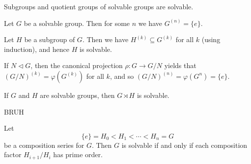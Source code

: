 \begin{corollary} \label{cor-solvable}
	Subgroups and quotient groups of solvable groups are solvable.
\end{corollary}
\begin{sketch}
	Let $G$ be a solvable group. Then for some $n$ we have $G^{(n)} = \{e\}$.
	
	Let $H$ be a subgroup of  $G$. Then we have $H^{(k)} \subseteq G^{(k)}$ for all $k$ (using induction), and hence $H$ is solvable.
	
	If $N \lhd G$, then the canonical projection $\rho : G \rightarrow G/N$ yields that $(G/N)^{(k)} = \varphi(G^{(k)})$ for all $k$, and so   $(G/N)^{(n)} = \varphi(G^{n}) =\{e\}$.
\end{sketch}

\begin{proposition}
	If $G$ and $H$ are solvable groups, then $G\rtimes H$ is solvable.
\end{proposition}
\begin{sketch}
	BRUH
\end{sketch}




\begin{theorem}
	Let
	$$\{e\} = H_0 < H_1 < \cdots < H_n = G$$
	be a composition series for $G$. Then $G$ is solvable if and only if each composition factor $H_{i+1}/H_i$ has prime order.
\end{theorem}

